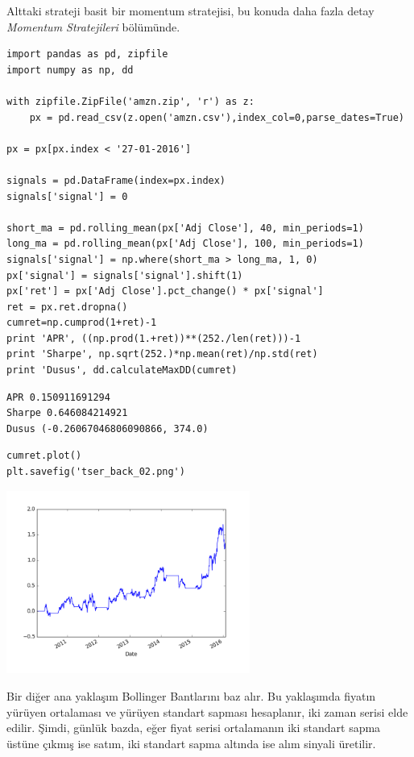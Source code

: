\documentclass[12pt,fleqn]{article}\usepackage{../../common}
\begin{document}
Alttaki strateji basit bir momentum stratejisi, bu konuda daha fazla detay {\em
  Momentum Stratejileri} bölümünde.

\begin{verbatim}
import pandas as pd, zipfile
import numpy as np, dd

with zipfile.ZipFile('amzn.zip', 'r') as z:
    px = pd.read_csv(z.open('amzn.csv'),index_col=0,parse_dates=True)

px = px[px.index < '27-01-2016']

signals = pd.DataFrame(index=px.index) 
signals['signal'] = 0 

short_ma = pd.rolling_mean(px['Adj Close'], 40, min_periods=1) 
long_ma = pd.rolling_mean(px['Adj Close'], 100, min_periods=1) 
signals['signal'] = np.where(short_ma > long_ma, 1, 0) 
px['signal'] = signals['signal'].shift(1) 
px['ret'] = px['Adj Close'].pct_change() * px['signal']
ret = px.ret.dropna()
cumret=np.cumprod(1+ret)-1
print 'APR', ((np.prod(1.+ret))**(252./len(ret)))-1
print 'Sharpe', np.sqrt(252.)*np.mean(ret)/np.std(ret)
print 'Dusus', dd.calculateMaxDD(cumret)
\end{verbatim}

\begin{verbatim}
APR 0.150911691294
Sharpe 0.646084214921
Dusus (-0.26067046806090866, 374.0)
\end{verbatim}

\begin{verbatim}
cumret.plot()
plt.savefig('tser_back_02.png')
\end{verbatim}

\includegraphics[height=6cm]{tser_back_02.png}

Bir diğer ana yaklaşım Bollinger Bantlarını baz alır. Bu yaklaşımda fiyatın
yürüyen ortalaması ve yürüyen standart sapması hesaplanır, iki zaman serisi elde
edilir. Şimdi, günlük bazda, eğer fiyat serisi ortalamanın iki standart sapma
üstüne çıkmış ise satım, iki standart sapma altında ise alım sinyali üretilir.
\end{document}
